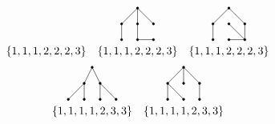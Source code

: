 \documentclass{article}
\begin{document}
\[\begin{array}{ccc}
\begin{tikzpicture}[scale=.5]
	\end{tikzpicture}&\begin{tikzpicture}[scale=.5]
		\draw(-1,0)--(-1,1)--(0,2)--(1,1);\draw(0,2)--(0,1)--(0,0)--(1,0);
		\filldraw(-1,0)circle(2pt)(-1,1)circle(2pt)(0,2)circle(2pt)(1,1)circle(2pt)(1,0)circle(2pt)(0,0)circle(2pt)(0,1)circle(2pt);
	\end{tikzpicture}&\begin{tikzpicture}[scale=.5]
		\draw(-1,0)--(-1,1)--(0,2)--(1,1)--(1,0)--(0,0);\draw(1,0)--(0,1);
		\filldraw(-1,0)circle(2pt)(-1,1)circle(2pt)(0,2)circle(2pt)(1,1)circle(2pt)(1,0)circle(2pt)(0,0)circle(2pt)(0,1)circle(2pt);
	\end{tikzpicture}
	\\
	\{1, 1, 1, 2, 2, 2, 3\}&\{1, 1, 1, 2, 2, 2, 3\}&\{1, 1, 1, 2, 2, 2, 3\}
	\end{array}\]\[\begin{array}{cc}
	\begin{tikzpicture}[scale=.5]
		\draw(-1.5,0)--(-.5,1)--(0,2)--(.5,1)--(1.5,0);\draw(-.5,1)--(-.5,0);\draw(.5,1)--(.5,0);
		\filldraw(0,2)circle(2pt)(-1.5,0)circle(2pt)(-.5,0)circle(2pt)(1.5,0)circle(2pt)(.5,0)circle(2pt)(-.5,1)circle(2pt)(.5,1)circle(2pt);
	\end{tikzpicture}&\begin{tikzpicture}[scale=.5]
		\draw(-1,0)--(-1,1)--(0,2)--(1,1)--(1,0);\draw(0,0)--(-1,1);\draw(0,2)--(0,1);
		\filldraw(-1,0)circle(2pt)(-1,1)circle(2pt)(0,2)circle(2pt)(1,1)circle(2pt)(1,0)circle(2pt)(0,0)circle(2pt)(0,1)circle(2pt);
	\end{tikzpicture}
	\\
	\{1, 1, 1, 1, 2, 3, 3\}&\{1, 1, 1, 1, 2, 3, 3\}
	\end{array}\]

	\newpage
\end{document}
